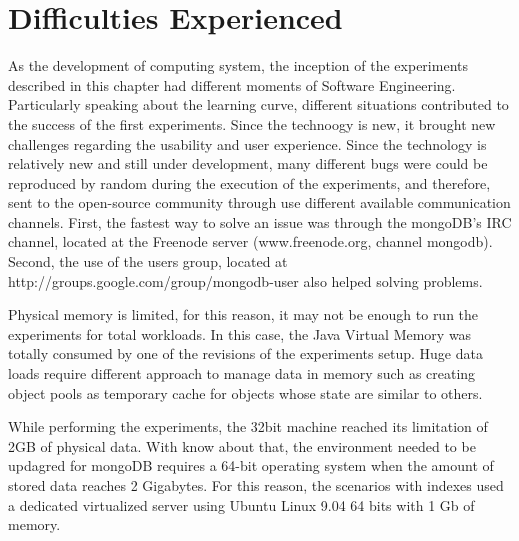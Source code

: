 \section{Difficulties Experienced}
\label{sec:experiments-difficulties}
As the development of computing system, the inception of the experiments
described in this chapter had different moments of Software Engineering.
Particularly speaking about the learning curve, different situations
contributed to the success of the first experiments. Since the technoogy is
new, it brought new challenges regarding the usability and user experience.
Since the technology is relatively new and still under development, many
different bugs were could be reproduced by random during the execution of the
experiments, and therefore, sent to the open-source community through use 
different available communication channels. First, the fastest way to solve an
issue was through the mongoDB's IRC channel, located at the Freenode server
(www.freenode.org, channel mongodb). Second, the use of the users group, located
at http://groups.google.com/group/mongodb-user also helped solving problems.

Physical memory is limited, for this reason, it may not be enough to run the
experiments for total workloads. In this case, the Java Virtual Memory was
totally consumed by one of the revisions of the experiments setup. Huge data
loads require different approach to manage data in memory such as creating
object pools as temporary cache for objects whose state are similar to others.

While performing the experiments, the 32bit machine reached its limitation of
2GB of physical data. With know about that, the environment needed to be
updagred for mongoDB requires a 64-bit operating system when the amount of
stored data reaches 2 Gigabytes. For this reason, the scenarios with indexes
used a dedicated virtualized server using Ubuntu Linux 9.04 64 bits with 1 Gb
of memory.